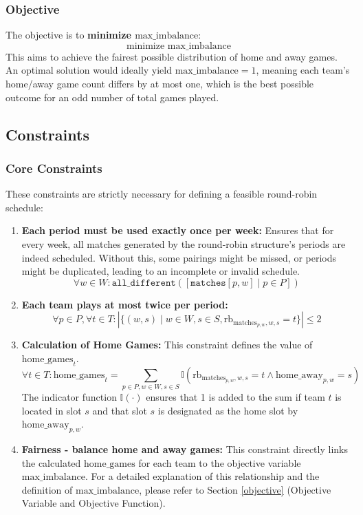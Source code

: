 \documentclass{article}
\begin{document}
\subsubsection{Objective}
The objective is to \textbf{minimize $\text{max\_imbalance}$}:
\[ \text{minimize } \text{max\_imbalance} \]
This aims to achieve the fairest possible distribution of home and away games. An optimal solution would ideally yield $\text{max\_imbalance}=1$, meaning each team's home/away game count differs by at most one, which is the best possible outcome for an odd number of total games played.


\subsection{Constraints}
\subsubsection{Core Constraints}
These constraints are strictly necessary for defining a feasible round-robin schedule:
\begin{enumerate}
    \item \textbf{Each period must be used exactly once per week:} Ensures that for every week, all matches generated by the round-robin structure's periods are indeed scheduled. Without this, some pairings might be missed, or periods might be duplicated, leading to an incomplete or invalid schedule.
    \[ \forall w \in W : \texttt{all\_different}([\texttt{matches}[p, w] \mid p \in P]) \]

    \item \textbf{Each team plays at most twice per period:} 
\[ \forall p \in P, \forall t \in T : \left| \{ (w, s) \mid w \in W, s \in S, \text{rb}_{\text{matches}_{p, w}, w, s} = t \} \right| \leq 2 \]

 \item \textbf{Calculation of Home Games:} This constraint defines the value of $\text{home\_games}_{t}$.
\[ \forall t \in T : \text{home\_games}_{t} = \sum_{p \in P, w \in W, s \in S} \mathbb{I}\left( \text{rb}_{\text{matches}_{p, w}, w, s} = t \land \text{home\_away}_{p, w} = s \right) \]
The indicator function $\mathbb{I}(\cdot)$ ensures that 1 is added to the sum if team $t$ is located in slot $s$ and that slot $s$ is designated as the home slot by $\text{home\_away}_{p,w}$.



    \item \textbf{Fairness - balance home and away games:} This constraint directly links the calculated $\text{home\_games}$ for each team to the objective variable $\text{max\_imbalance}$. For a detailed explanation of this relationship and the definition of $\text{max\_imbalance}$, please refer to Section \ref{objective} (Objective Variable and Objective Function).
    
    
\end{enumerate}
\end{document}
